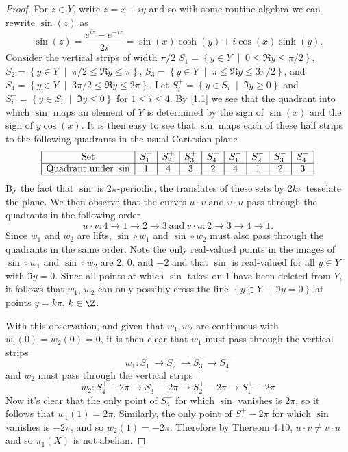 \documentclass[10pt]{amsart}
\begin{document}
\begin{thm}
\begin{proof}
    For $z \in Y$, write $z = x + iy$ and so with some routine algebra we can rewrite $\sin(z)$ as
    \begin{equation}\label{1.1}
      \sin(z) = \frac{e^{iz} - e^{-iz}}{2i} = \sin(x)\cosh(y) + i\cos(x)\sinh(y).
    \end{equation}
    Consider the vertical strips of width $\pi/2$
    $S_1 = \left\{y \in Y \;\middle\vert\; 0 \leq \Re{y} \leq \pi/2 \right\}$, 
    $S_2 = \left\{y \in Y \;\middle\vert\; \pi/2 \leq \Re{y} \leq \pi \right\}$, 
    $S_3 = \left\{y \in Y \;\middle\vert\; \pi \leq \Re{y} \leq 3\pi/2 \right\}$, and 
    $S_4 = \left\{y \in Y \;\middle\vert\; 3\pi/2 \leq \Re{y} \leq 2\pi \right\}$. 
    Let $S_i^+ = \left\{y \in S_i \;\middle\vert\; \Im{y} \geq 0\right\}$ and $S_i^- = \left\{y \in S_i \;\middle\vert\; \Im{y} \leq 0 \right\}$ for $1 \leq i \leq 4$.
    By \eqref{1.1} we see that the quadrant into which $\sin$ maps an element of $Y$ is determined by the sign of $\sin(x)$ and the sign of $y\cos(x)$.
    It is then easy to see that $\sin$ maps each of these half strips to the following quadrants in the usual Cartesian plane
    $$\begin{array}{|c|c|c|c|c|c|c|c|c|}
      \hline
      \text{Set} & S_1^+ & S_2^+ & S_3^+ & S_4^+ & S_1^- & S_2^- & S_3^- & S_4^-\\
      \hline
      \text{Quadrant under}\ \sin & 1 & 4 & 3 & 2 & 4 & 1 & 2 & 3\\
      \hline
    \end{array}$$
    By the fact that $\sin$ is $2\pi$-periodic, the translates of these sets by $2k\pi$ tesselate the plane.
    We then observe that the curves $u \cdot v$ and $v \cdot u$ pass through the quadrants in the following order
    $$u \cdot v \colon 4 \rightarrow 1 \rightarrow 2 \rightarrow 3\ \text{and}\ v \cdot u \colon 2 \rightarrow 3 \rightarrow 4 \rightarrow 1.$$
    Since $w_1$ and $w_2$ are lifts, $\sin \circ w_1$ and $\sin \circ w_2$ must also pass through the quadrants in the same order.
    Note the only real-valued points in the images of $\sin \circ w_1$ and $\sin \circ w_2$ are $2$, $0$, and $-2$ and that $\sin$ is real-valued for all $y \in Y$ with $\Im{y} = 0$.
    Since all points at which $\sin$ takes on $1$ have been deleted from $Y$, it follows that $w_1$, $w_2$ can only possibly cross the line $\left\{y \in Y \;\middle\vert\; \Im{y} = 0\right\}$ at points $y = k\pi$, $k \in \Z$.
    
    With this observation, and given that $w_1, w_2$ are continuous with $w_1(0) = w_2(0) = 0$, it is then clear that $w_1$ must pass through the vertical strips
    $$w_1 \colon S_1^- \rightarrow S_2^- \rightarrow S_3^- \rightarrow S_4^-$$
    and $w_2$ must pass through the vertical strips
    $$w_2 \colon S_4^+ - 2\pi \rightarrow S_3^+ - 2\pi \rightarrow S_2^+ - 2\pi \rightarrow S_1^+ - 2\pi$$
    Now it's clear that the only point of $S_4^-$ for which $\sin$ vanishes is $2\pi$, so it follows that $w_1(1) = 2\pi$.
    Similarly, the only point of $S_1^+ - 2\pi$ for which $\sin$ vanishes is $-2\pi$, and so $w_2(1) = -2\pi$.
    Therefore by Thereom 4.10, $u \cdot v \neq v \cdot u$ and so $\pi_1(X)$ is not abelian.
  \end{proof}
\end{thm}
\end{document}

